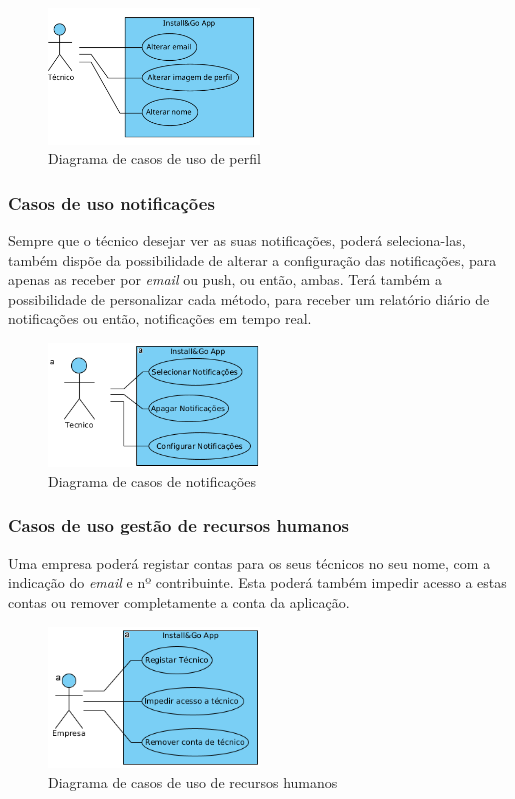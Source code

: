 \begin{figure}[htb]
  \centering
  
  \includegraphics[width=0.5\textwidth]{images/diagramas/casos_de_uso/use_case_perfil.png}
  \caption{Diagrama de casos de uso de perfil}
  \label{fig:17}
\end{figure}

\newpage

\subsubsection{Casos de uso notificações}

Sempre que o técnico desejar ver as suas notificações, poderá seleciona-las, também dispõe da possibilidade de alterar a configuração das notificações, para apenas as receber por \textit{email} ou push, ou então, ambas. Terá também a possibilidade de personalizar cada método, para receber um relatório diário de notificações ou então, notificações em tempo real.

\begin{figure}[htb]
  \centering
  \includegraphics[width=0.5\textwidth]{images/diagramas/casos_de_uso/use_case_notificacoes.png}
  \caption{Diagrama de casos de notificações}
  \label{fig:18}
\end{figure}

\subsubsection{Casos de uso gestão de recursos humanos}

Uma empresa poderá registar contas para os seus técnicos no seu nome, com a indicação do \textit{email} e nº contribuinte. Esta poderá também impedir acesso a estas contas ou remover completamente a conta da aplicação.

\begin{figure}[htb]
  \centering
  \includegraphics[width=0.5\textwidth]{images/diagramas/casos_de_uso/use_case_rec_humanos.png}
  \caption{Diagrama de casos de uso de recursos humanos}
  \label{fig:19}
\end{figure}